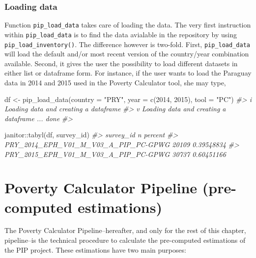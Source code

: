 \documentclass[
]{book}
\newenvironment{Shaded}{\begin{snugshade}}{\end{snugshade}}
\newcommand{\AttributeTok}[1]{\textcolor[rgb]{0.77,0.63,0.00}{#1}}
\newcommand{\CommentTok}[1]{\textcolor[rgb]{0.56,0.35,0.01}{\textit{#1}}}
\newcommand{\DecValTok}[1]{\textcolor[rgb]{0.00,0.00,0.81}{#1}}
\newcommand{\FunctionTok}[1]{\textcolor[rgb]{0.00,0.00,0.00}{#1}}
\newcommand{\NormalTok}[1]{#1}
\newcommand{\OtherTok}[1]{\textcolor[rgb]{0.56,0.35,0.01}{#1}}
\newcommand{\SpecialCharTok}[1]{\textcolor[rgb]{0.00,0.00,0.00}{#1}}
\newcommand{\StringTok}[1]{\textcolor[rgb]{0.31,0.60,0.02}{#1}}
\begin{document}
\hypertarget{loading-data}{%
\subsection{Loading data}\label{loading-data}}

Function \texttt{pip\_load\_data} takes care of loading the data. The very first instruction within \texttt{pip\_load\_data} is to find the data avialable in the repository by using \texttt{pip\_load\_inventory()}. The difference however is two-fold. First, \texttt{pip\_load\_data} will load the default and/or most recent version of the country/year combination available. Second, it gives the user the possibility to load different datasets in either list or dataframe form. For instance, if the user wants to load the Paraguay data in 2014 and 2015 used in the Poverty Calculator tool, she may type,

\begin{Shaded}
\begin{Highlighting}[]

\NormalTok{df }\OtherTok{\textless{}{-}} \FunctionTok{pip\_load\_data}\NormalTok{(}\AttributeTok{country =} \StringTok{"PRY"}\NormalTok{,}
                    \AttributeTok{year    =} \FunctionTok{c}\NormalTok{(}\DecValTok{2014}\NormalTok{, }\DecValTok{2015}\NormalTok{), }
                    \AttributeTok{tool    =} \StringTok{"PC"}\NormalTok{)}
\CommentTok{\#\textgreater{} i Loading data and creating a dataframe}
\CommentTok{\#\textgreater{} v Loading data and creating a dataframe ... done}
\CommentTok{\#\textgreater{} }

\NormalTok{janitor}\SpecialCharTok{::}\FunctionTok{tabyl}\NormalTok{(df, survey\_id)}
\CommentTok{\#\textgreater{}                             survey\_id     n    percent}
\CommentTok{\#\textgreater{}  PRY\_2014\_EPH\_V01\_M\_V03\_A\_PIP\_PC{-}GPWG 20109 0.39548834}
\CommentTok{\#\textgreater{}  PRY\_2015\_EPH\_V01\_M\_V03\_A\_PIP\_PC{-}GPWG 30737 0.60451166}
\end{Highlighting}
\end{Shaded}

\hypertarget{pcpipeline}{%
\chapter{Poverty Calculator Pipeline (pre-computed estimations)}\label{pcpipeline}}

The Poverty Calculator Pipeline--hereafter, and only for the rest of this
chapter, pipeline--is the technical procedure to calculate the pre-computed
estimations of the PIP project. These estimations have two main purposes:
\end{document}

